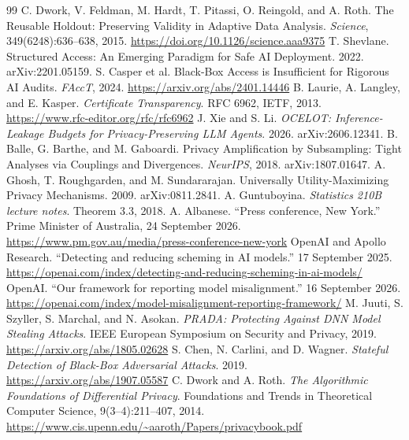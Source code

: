 \documentclass[10pt,twocolumn]{article}
\begin{document}
\begin{thebibliography}{99}
 C. Dwork, V. Feldman, M. Hardt, T. Pitassi, O. Reingold, and A. Roth. The Reusable Holdout: Preserving Validity in Adaptive Data Analysis. \emph{Science}, 349(6248):636--638, 2015. \url{https://doi.org/10.1126/science.aaa9375}
 T. Shevlane. Structured Access: An Emerging Paradigm for Safe AI Deployment. 2022. arXiv:2201.05159.
 S. Casper et al. Black-Box Access is Insufficient for Rigorous AI Audits. \emph{FAccT}, 2024. \url{https://arxiv.org/abs/2401.14446}
 B. Laurie, A. Langley, and E. Kasper. \emph{Certificate Transparency}. RFC 6962, IETF, 2013. \url{https://www.rfc-editor.org/rfc/rfc6962}
 J. Xie and S. Li. \emph{OCELOT: Inference-Leakage Budgets for Privacy-Preserving LLM Agents}. 2026. arXiv:2606.12341.
 B. Balle, G. Barthe, and M. Gaboardi. Privacy Amplification by Subsampling: Tight Analyses via Couplings and Divergences. \emph{NeurIPS}, 2018. arXiv:1807.01647.
 A. Ghosh, T. Roughgarden, and M. Sundararajan. Universally Utility-Maximizing Privacy Mechanisms. 2009. arXiv:0811.2841.
 A. Guntuboyina. \emph{Statistics 210B lecture notes}. Theorem 3.3, 2018.
 A. Albanese. ``Press conference, New York.'' Prime Minister of Australia, 24 September 2026. \url{https://www.pm.gov.au/media/press-conference-new-york}
 OpenAI and Apollo Research. ``Detecting and reducing scheming in AI models.'' 17 September 2025. \url{https://openai.com/index/detecting-and-reducing-scheming-in-ai-models/}
 OpenAI. ``Our framework for reporting model misalignment.'' 16 September 2026. \url{https://openai.com/index/model-misalignment-reporting-framework/}
 M. Juuti, S. Szyller, S. Marchal, and N. Asokan. \emph{PRADA: Protecting Against DNN Model Stealing Attacks}. IEEE European Symposium on Security and Privacy, 2019. \url{https://arxiv.org/abs/1805.02628}
 S. Chen, N. Carlini, and D. Wagner. \emph{Stateful Detection of Black-Box Adversarial Attacks}. 2019. \url{https://arxiv.org/abs/1907.05587}
 C. Dwork and A. Roth. \emph{The Algorithmic Foundations of Differential Privacy}. Foundations and Trends in Theoretical Computer Science, 9(3--4):211--407, 2014. \url{https://www.cis.upenn.edu/~aaroth/Papers/privacybook.pdf}
\end{thebibliography}
\end{document}
